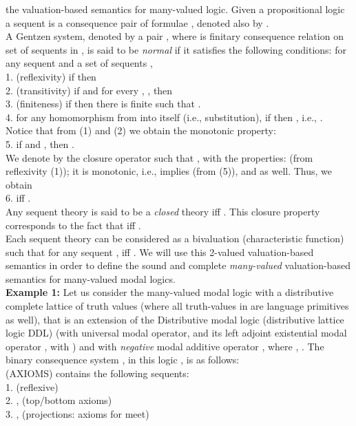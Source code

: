 \documentclass[10pt,twocolumn]{article}
\newcommand{\A}{\mathcal{A}} \newcommand{\B}{\mathcal{B}}
\begin{document}
the valuation-based semantics for many-valued logic.
Given a propositional logic   a
sequent
 is a consequence pair of formulae , denoted also by . \\A Gentzen system, denoted by a pair , where  is finitary consequence relation on set of sequents in ,
 is said to be \emph{normal} if it satisfies the following
 conditions: for any sequent  and a set of
 sequents , \\
1. (reflexivity) if  then \\
 2. (transitivity) if  and for every , , then \\
 3. (finiteness) if  then there is finite  such that .\\
 4. for any homomorphism  from  into itself
 (i.e., substitution), if  then , i.e., .\\
 Notice that from (1) and (2) we obtain the monotonic property:\\
 5.  if   and , then .\\
 We denote by  the
 closure operator such that , with the properties:  (from
 reflexivity (1)); it is monotonic, i.e.,  implies
  (from  (5)), and   as well. Thus, we obtain \\
 6.  iff .\\
 Any sequent theory  is said to be a \emph{closed}
 theory iff . This closure property corresponds to the
 fact that  iff .\\
 Each sequent theory  can be considered as a bivaluation (characteristic function)  such that for any sequent ,  iff .
We will use this 2-valued valuation-based semantics in order to
define the sound and complete \emph{many-valued} valuation-based
semantics for many-valued modal logics.\\
\textbf{Example 1:} Let us consider the many-valued modal logic with a distributive complete lattice  of
  truth values (where all truth-values in  are language primitives as well), that is an
 extension of the Distributive modal logic (distributive lattice
 logic DDL)  \cite{Dunn95,GNVe05}
 (with  universal modal operator, and its left adjoint
 existential modal operator , with )
 and with \emph{negative} modal additive operator , where , . The binary consequence
 system ,  in this logic  , is as follows:\\
 (AXIOMS)  contains  the following sequents:\\
 1.  (reflexive)\\
 2. ,  (top/bottom axioms)\\
  3. ,  (projections: axioms for
 meet)\\
\end{document}
